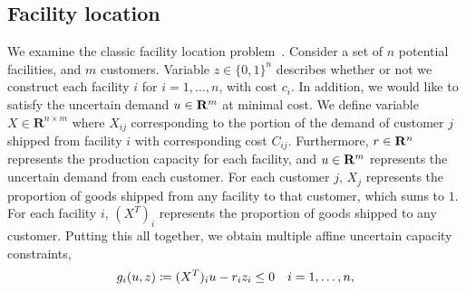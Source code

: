 {\subsection{Facility location}
\label{sub:facility}
We examine the classic facility location problem~\citep{bertsimas_probabilistic,HOLMBERG1999544}.
Consider a set of $n$ potential facilities, and $m$ customers.
Variable $z \in \{0, 1\}^n$ describes whether or not we construct each facility $i$ for $i=1, \dots, n$,  with cost $c_i$.
In addition, we would like to satisfy the uncertain demand $u\in {\mathbf R}^m$ at minimal cost.
We define variable $X\in\mathbf{R}^{n\times m}$ where $X_{ij}$ corresponding to the portion of the demand of customer $j$ shipped from facility $i$ with corresponding cost $C_{ij}$.
Furthermore, $r \in {\mathbf R}^n$ represents the production capacity for each facility, and $u\in {\mathbf R}^m$ represents the uncertain demand from each customer.
For each customer $j$, $X_j$ represents the proportion of goods shipped from any facility to that customer, which sums to $1$.
For each facility $i$, $(X^T)_i$ represents the proportion of goods shipped to any customer.
Putting this all together, we obtain multiple affine uncertain capacity constraints,
\begin{equation*}
	g_i(u,z) \coloneqq (X^T)_i u - r_i z_i \leq 0 \quad i = 1,\dots,n,
\end{equation*}
}
